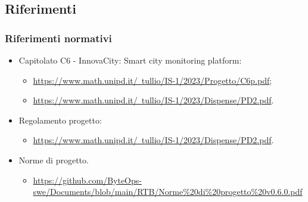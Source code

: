 \subsection{Riferimenti}
\subsubsection{Riferimenti normativi}
\begin{itemize}
    \item Capitolato C6 - InnovaCity: Smart city monitoring platform:
    \begin{itemize}
        \item \href{https://www.math.unipd.it/~tullio/IS-1/2023/Progetto/C6.pdf}{https://www.math.unipd.it/~tullio/IS-1/2023/Progetto/C6p.pdf};
        \item \href{https://www.math.unipd.it/~tullio/IS-1/2023/Dispense/PD2.pdf}{https://www.math.unipd.it/~tullio/IS-1/2023/Dispense/PD2.pdf}.
    \end{itemize}
    \item Regolamento progetto:
    \begin{itemize}
        \item \href{https://www.math.unipd.it/~tullio/IS-1/2023/Dispense/PD2.pdf}{https://www.math.unipd.it/~tullio/IS-1/2023/Dispense/PD2.pdf}.
    \end{itemize}
    \item Norme di progetto.
    \begin{itemize}
        \item \href{https://github.com/ByteOps-swe/Documents/blob/main/RTB/Norme\%20di\%20progetto\%20v0.6.0.pdf}{https://github.com/ByteOps-swe/Documents/blob/main/RTB/Norme\%20di\%20progetto\%20v0.6.0.pdf}
    \end{itemize}
\end{itemize}
